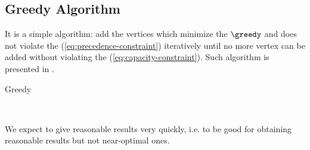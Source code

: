 \subsection{Greedy Algorithm}

It is a simple algorithm: add the vertices which minimize the \greedyCriteriaText $\greedy$ and does not violate the \precedenceConstraint (\eqref{eq:precedence-constraint}) iteratively until no more vertex can be added without violating the \capacityConstraint (\eqref{eq:capacity-constraint}). Such algorithm is presented in .

\begin{algorithm}[H]
    \caption{Greedy}
    \begin{algorithmic}[1]
        \Require{$\vertices, \edges, \weight, \maximumWeight$}
        \EndWhile
        \\
    \end{algorithmic}
    \label{algorithm:greedy}
\end{algorithm}

We expect  to give reasonable results very quickly, i.e. to be good for obtaining reasonable results but not near-optimal ones.
